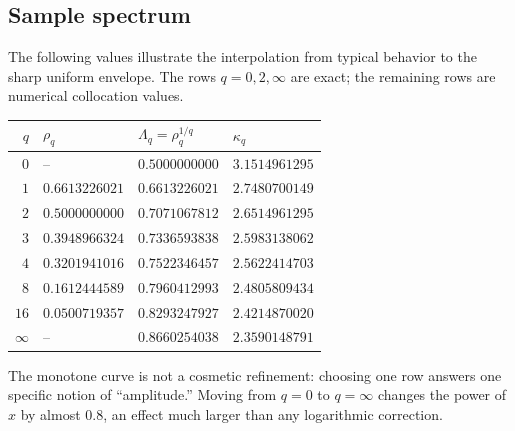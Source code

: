 \documentclass[11pt,oneside]{article}
\numberwithin{equation}{section}
\theoremstyle{definition}
\theoremstyle{remark}
\begin{document}
\subsection{Sample spectrum}

The following values illustrate the interpolation from typical behavior to the sharp
uniform envelope.  The rows $q=0,2,\infty$ are exact; the remaining rows are numerical
collocation values.

\begin{center}
\begin{tabular}{@{}rlll@{}}
\toprule
$q$ & $\rho_q$ & $\Lambda_q=\rho_q^{1/q}$ & $\kappa_q$\\
\midrule
$0$ & -- & $0.5000000000$ & $3.1514961295$\\
$1$ & $0.6613226021$ & $0.6613226021$ & $2.7480700149$\\
$2$ & $0.5000000000$ & $0.7071067812$ & $2.6514961295$\\
$3$ & $0.3948966324$ & $0.7336593838$ & $2.5983138062$\\
$4$ & $0.3201941016$ & $0.7522346457$ & $2.5622414703$\\
$8$ & $0.1612444589$ & $0.7960412993$ & $2.4805809434$\\
$16$& $0.0500719357$ & $0.8293247927$ & $2.4214870020$\\
$\infty$ & -- & $0.8660254038$ & $2.3590148791$\\
\bottomrule
\end{tabular}
\end{center}

\begin{center}
\end{center}

The monotone curve is not a cosmetic refinement: choosing one row answers one specific
notion of ``amplitude.''  Moving from $q=0$ to $q=\infty$ changes the power of $x$ by almost
$0.8$, an effect much larger than any logarithmic correction.
\end{document}
